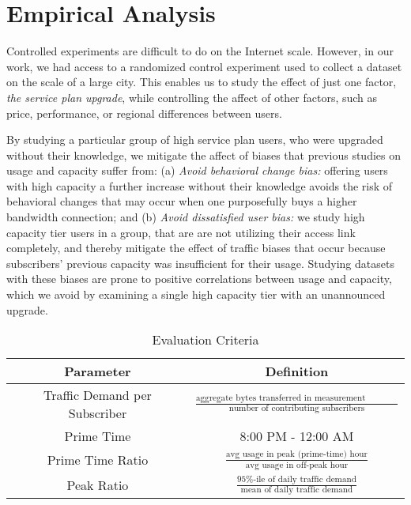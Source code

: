 \section{Empirical Analysis}\label{sec:analysis}


Controlled experiments are difficult to do on the Internet scale. However, in 
our work, we had access to a randomized control experiment used to collect a 
dataset on the scale of a large city. This enables us to study the effect of 
just one factor, \emph{the service plan upgrade}, while controlling the affect 
of other factors, such as price, performance, or regional differences between 
users.

By studying a particular group of high service plan users, who were 
upgraded without their knowledge, we mitigate the affect of biases that 
previous studies on usage and capacity suffer from: (a) \emph{Avoid behavioral 
change bias:} offering users with high capacity a further increase without 
their knowledge avoids the risk of behavioral changes that may occur when one 
purposefully buys a higher bandwidth connection; and (b) \emph{Avoid 
dissatisfied user bias:} we study high capacity tier users in a \control{} 
group, that are are not utilizing their access link completely, and thereby 
mitigate the effect of traffic biases that occur because subscribers' previous 
capacity was insufficient for their usage. Studying datasets with these biases 
are prone to positive correlations between usage and capacity, which we 
avoid by examining a single high capacity tier with an unannounced upgrade.

\begin{table}[ht]
\small 
\begin{tabular}{| c | c |}\hline
\textbf{Parameter} & \textbf{Definition}	\\\hline
Traffic Demand per Subscriber& \(\frac{\text{aggregate bytes transferred in 
measurement interval}}{\text{number of contributing subscribers}}\)	\\
Prime Time		& 8:00 PM - 12:00 AM   		\\
Prime Time Ratio 	& \( \frac{ \text{avg usage in peak (prime-time) 
hour}}{ \text{avg usage in off-peak hour}}\) 		\\
Peak Ratio 		& \(\frac{\text{95\%-ile of daily traffic 
demand}}{\text{mean of daily traffic demand}}\)	\\\hline
\end{tabular}
\caption{Evaluation Criteria}
\label{tab:eval-criteria}
\end{table}


